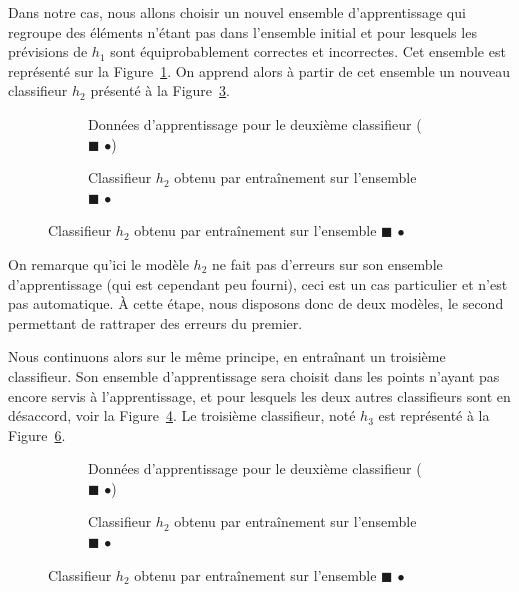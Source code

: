 Dans notre cas, nous allons choisir un nouvel ensemble d'apprentissage qui regroupe des éléments n'étant pas dans l'ensemble initial et pour lesquels les prévisions de $h_1$ sont équiprobablement correctes et incorrectes. Cet ensemble est représenté sur la Figure~\ref{fig:boosting_deux_app}. On apprend alors à partir de cet ensemble un nouveau classifieur $h_2$ présenté à la Figure~\ref{fig:boosting_deux_modele}.

\begin{figure}[h]
	\begin{subfigure}{.45\textwidth}
		
		\caption{Données d'apprentissage pour le deuxième classifieur ($\blacksquare$ \large{$\bullet$})}
		\label{fig:boosting_deux_app}
	\end{subfigure}\hfill
	\begin{subfigure}{.45\textwidth}
		
		\caption{Classifieur $h_2$ obtenu par entraînement sur l'ensemble $\blacksquare$ \large{$\bullet$}}
		\label{fig:boosting_deux_modele}
	\end{subfigure}\hfill
\end{figure}

On remarque qu'ici le modèle $h_2$ ne fait pas d'erreurs sur son ensemble d'apprentissage (qui est cependant peu fourni), ceci est un cas particulier et n'est pas automatique. À cette étape, nous disposons donc de deux modèles, le second permettant de \og rattraper\fg{} des erreurs du premier.

Nous continuons alors sur le même principe, en entraînant un troisième classifieur. Son ensemble d'apprentissage sera choisit dans les points n'ayant pas encore servis à l'apprentissage, et pour lesquels les deux autres classifieurs sont en désaccord, voir la Figure~\ref{fig:boosting_trois_app}. Le troisième classifieur, noté $h_3$ est représenté à la Figure~\ref{fig:boosting_trois_modele}.

\begin{figure}[h]
	\begin{subfigure}{.45\textwidth}
		
		\caption{Données d'apprentissage pour le deuxième classifieur ($\blacksquare$ \large{$\bullet$})}
		\label{fig:boosting_trois_app}
	\end{subfigure}\hfill
	\begin{subfigure}{.45\textwidth}
		
		\caption{Classifieur $h_2$ obtenu par entraînement sur l'ensemble $\blacksquare$ \large{$\bullet$}}
		\label{fig:boosting_trois_modele}
	\end{subfigure}\hfill
\end{figure}

